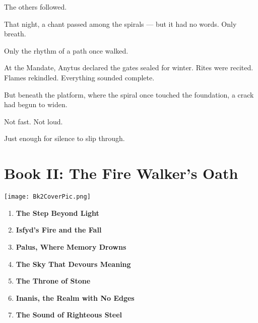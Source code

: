 \documentclass[12pt]{article}
\begin{document}
The others followed.

That night, a chant passed among the spirals —  
but it had no words.  
Only breath.

Only the rhythm of a path once walked.

At the Mandate, Anytus declared the gates sealed for winter.  
Rites were recited.  
Flames rekindled.  
Everything sounded complete.

But beneath the platform,  
where the spiral once touched the foundation,  
a crack had begun to widen.

Not fast.  
Not loud.

Just enough  
for silence to slip through.

\newpage

\section*{Book II: The Fire Walker's Oath}

\vspace{.5in}

\begin{center}
    \texttt{[image: Bk2CoverPic.png]}
\end{center}

\vspace{.5in}

\begin{enumerate}
    \item \textbf{The Step Beyond Light} 

    \vspace{1em}
    \item \textbf{Isfyd's Fire and the Fall} 

    \vspace{1em}
    \item \textbf{Palus, Where Memory Drowns} 

    \vspace{1em}
    \item \textbf{The Sky That Devours Meaning} 

    \vspace{1em}
    \item \textbf{The Throne of Stone} 

    \vspace{1em}
    \item \textbf{Inanis, the Realm with No Edges}

    \vspace{1em}
    \item \textbf{The Sound of Righteous Steel} 

\end{enumerate}
\end{document}

